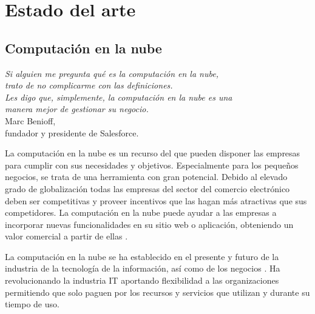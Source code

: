 \chapter{Estado del arte} 
\label{sec:arte}

\section{Computación en la nube}

\begin{flushright}
\begin{minipage}[b][4cm][t]{11cm}
\begin{flushright}
{\small \emph{Si alguien me pregunta qué es la computación en la nube,}} \vspace{-1pt} \\
{\small \emph{trato de no complicarme con las definiciones.}} \vspace{-1pt} \\
{\small \emph{Les digo que, simplemente, la computación en la nube es una}} \vspace{-1pt}\\
{\small \emph{manera mejor de gestionar su negocio.}} \vspace{1mm}\\
{\footnotesize Marc Benioff,} \vspace{-1.5pt} \\
{\footnotesize fundador y presidente de Salesforce.\phantom{l}}
\end{flushright}
\end{minipage}
\end{flushright}

La computación en la nube es un recurso del que pueden disponer las empresas para cumplir con sus necesidades y objetivos. Especialmente para los pequeños negocios, se trata de una herramienta con gran potencial. Debido al elevado grado de globalización todas las empresas del sector del comercio electrónico deben ser competitivas y proveer incentivos que las hagan más atractivas que sus competidores. La computación en la nube puede ayudar a las empresas a incorporar nuevas funcionalidades en su sitio web o aplicación, obteniendo un valor comercial a partir de ellas \cite{Azad2016ImprovementOE}. 

La computación en la nube se ha establecido en el presente y futuro de la industria de la tecnología de la información, así como de los negocios \cite{Hashem}. Ha revolucionando la industria IT aportando flexibilidad a las organizaciones permitiendo que solo paguen por los recursos y servicios que utilizan y durante su tiempo de uso. 

